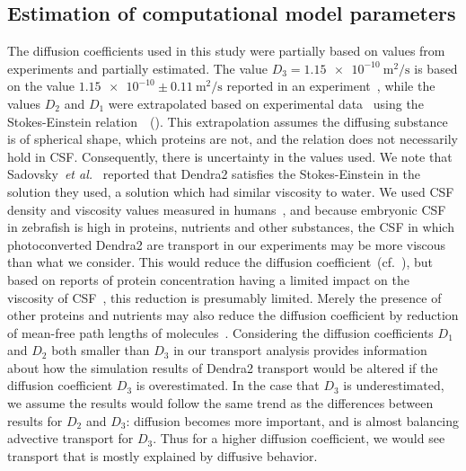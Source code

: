 \documentclass[fleqn]{wlscirep}
\begin{document}
\subsection*{Estimation of computational model parameters}
The diffusion coefficients used in this study were partially based on values
from experiments and partially estimated. The value $D_3=\num{1.15e-10} \ \mathrm{m^2/s}$
is based on the value $\num{1.15e-10} \pm 0.11 \ \mathrm{m^2/s}$ reported in an
experiment~\cite{GuraSadovsky2017MeasurementExpansion}, while the values $D_2$ and
$D_1$ were extrapolated based on experimental data~\cite{Swaminathan1997PhotobleachingDiffusion,
Potma2001ReducedCells, Mahmood2023ExosomeTemperature} using the Stokes-Einstein
relation~\cite{Einstein1905UberTeilchen}~().
This extrapolation assumes the diffusing substance is of spherical shape, which proteins are not,
and the relation does not necessarily hold in CSF. Consequently, there is uncertainty in the values used.
We note that Sadovsky~\emph{et al.}~\cite{GuraSadovsky2017MeasurementExpansion} reported that
Dendra2 satisfies the Stokes-Einstein in the solution they used, a solution which had similar viscosity
to water. We used CSF density and viscosity values measured in humans~\cite{Bloomfield1998EffectsFluid},
and because embryonic CSF in zebrafish is high in proteins, nutrients and other substances,
the CSF in which photoconverted Dendra2 are transport in our experiments may be more viscous
than what we consider. This would reduce the diffusion coefficient~(cf.~),
but based on reports of protein concentration having a limited impact on the viscosity of
CSF~\cite{Bloomfield1998EffectsFluid, Brydon1995PhysicalViscosity}, this reduction is presumably
limited. Merely the presence of other proteins and nutrients may also reduce the diffusion
coefficient by reduction of mean-free path lengths of molecules~\cite{Cussler2009Diffusion:Systems}.
Considering the diffusion coefficients $D_1$ and $D_2$ both smaller than $D_3$ in our transport analysis
provides information about how the simulation results of Dendra2 transport would be altered if the
diffusion coefficient $D_3$ is overestimated. In the case that $D_3$ is underestimated, we assume the
results would follow the same trend as the differences between results for $D_2$ and $D_3$: diffusion becomes
more important, and is almost balancing advective transport for $D_3$. Thus for a higher diffusion coefficient,
we would see transport that is mostly explained by diffusive behavior.
\end{document}
